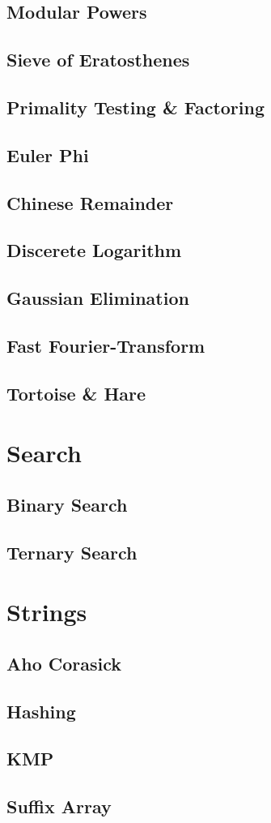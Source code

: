 \documentclass[twocolumn]{article}
\begin{document}
		\subsection{Modular Powers}
		\subsection{Sieve of Eratosthenes}
		\subsection{Primality Testing \& Factoring}
		\subsection{Euler Phi}
		\subsection{Chinese Remainder}
		\subsection{Discerete Logarithm}
		\subsection{Gaussian Elimination}
		\subsection{Fast Fourier-Transform}
			
		\subsection{Tortoise \& Hare}
			
	\section{Search}
		\subsection{Binary Search}
		\subsection{Ternary Search}
			
	\section{Strings}
		\subsection{Aho Corasick}
		\subsection{Hashing}
		\subsection{KMP}
		\subsection{Suffix Array}
\end{document}
